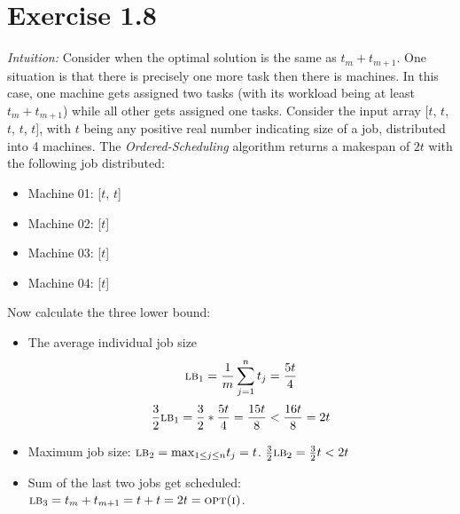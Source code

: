 \documentclass[11pt]{article}
\begin{document}
\section*{Exercise 1.8}
\textit{Intuition:} Consider when the optimal solution is the same as $t_{m}+t_{m+1}$. One situation is that there is precisely one more task then there is 
machines. In this case, one machine gets assigned two tasks (with its workload being at least $t_{m}+t_{m+1}$) while all other gets assigned one tasks. 
\newline
Consider the input array [$t$, $t$, $t$, $t$, $t$], with $t$ being any positive real number indicating size of a job, distributed into 4 machines. 
The \textit{Ordered-Scheduling} algorithm returns a makespan of $2t$ with the following job distributed:
\begin{itemize}
  \item Machine 01: [$t$, $t$]
  \item Machine 02: [$t$]
  \item Machine 03: [$t$]
  \item Machine 04: [$t$]
\end{itemize}
Now calculate the three lower bound:
\begin{itemize}
  \item The average individual job size
  \[ \textsc{lb}_1 = \frac{1}{m}\sum_{j=1}^{n}t_j = \frac{5t}{4}
  \]
  \[ \frac{3}{2} \textsc{lb}_1 = \frac{3}{2} * \frac{5t}{4} = \frac{15t}{8} < \frac{16t}{8} = 2t\]
  \item Maximum job size: $\textsc{lb}_2 = {\max}_{1 \leq j \leq n} t_{j} = t$. $\frac{3}{2} \textsc{lb}_2 = \frac{3}{2}t < 2t$
  \item Sum of the last two jobs get scheduled: $\textsc{lb}_3 = t_{m} + t_{m+1} = t+t = 2t = \textsc{opt(i)}$.
\end{itemize}
\end{document}
